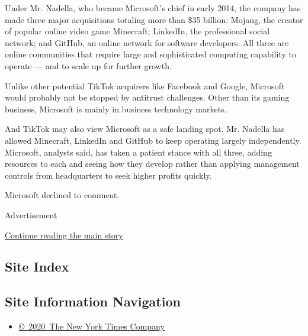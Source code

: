 Under Mr. Nadella, who became Microsoft's chief in early 2014, the
company has made three major acquisitions totaling more than \$35
billion: Mojang, the creator of popular online video game Minecraft;
LinkedIn, the professional social network; and GitHub, an online network
for software developers. All three are online communities that require
large and sophisticated computing capability to operate --- and to scale
up for further growth.

Unlike other potential TikTok acquirers like Facebook and Google,
Microsoft would probably not be stopped by antitrust challenges. Other
than its gaming business, Microsoft is mainly in business technology
markets.

And TikTok may also view Microsoft as a safe landing spot. Mr. Nadella
has allowed Minecraft, LinkedIn and GitHub to keep operating largely
independently. Microsoft, analysts said, has taken a patient stance with
all three, adding resources to each and seeing how they develop rather
than applying management controls from headquarters to seek higher
profits quickly.

Microsoft declined to comment.

Advertisement

\protect\hyperlink{after-bottom}{Continue reading the main story}

\hypertarget{site-index}{%
\subsection{Site Index}\label{site-index}}

\hypertarget{site-information-navigation}{%
\subsection{Site Information
Navigation}\label{site-information-navigation}}

\begin{itemize}
\tightlist
\item
  \href{https://help.nytimes3xbfgragh.onion/hc/en-us/articles/115014792127-Copyright-notice}{©~2020~The
  New York Times Company}
\end{itemize}

